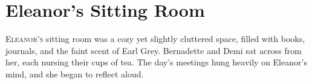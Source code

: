% 
% 
% 
% 
% 
% 
% 
% 
% 
\section*{Eleanor’s Sitting Room}

\lettrine{E}{leanor’s} sitting room was a cozy yet slightly cluttered space, filled with books, journals, and the faint scent of Earl Grey. Bernadette and Demi sat across from her, each nursing their cups of tea. The day’s meetings hung heavily on Eleanor’s mind, and she began to reflect aloud.

